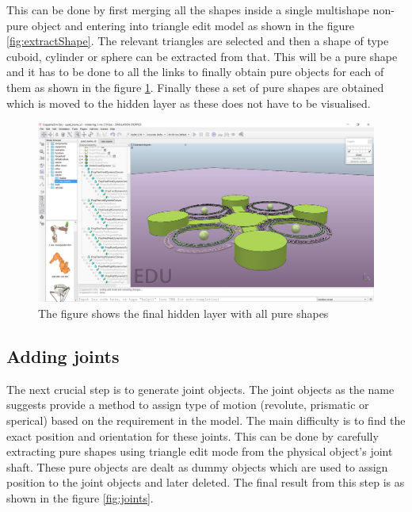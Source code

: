 \documentclass[a4paper, 12pt, oneside]{book}
\begin{document}
This can be done by first merging all the shapes inside a single multishape non-pure object and entering into triangle edit model as shown in the figure \ref{fig:extractShape}. The relevant triangles are selected and then a shape of type cuboid, cylinder or sphere can be extracted from that. This will be a pure shape and it has to be done to all the links to finally obtain pure objects for each of them as shown in the figure \ref{fig:hiddenLayer}. Finally these a set of pure shapes are obtained which is moved to the hidden layer as these does not have to be visualised.

\begin{figure}[H]
    \begin{center}
        \includegraphics[width=.95\linewidth]{figures/hidden_layer.JPG}
        \caption{The figure shows the final hidden layer with all pure shapes}
        \label{fig:hiddenLayer}
    \end{center}
\end{figure}

\subsection{Adding joints}
The next crucial step is to generate joint objects. The joint objects as the name suggests provide a method to assign type of motion (revolute, prismatic or sperical) based on the requirement in the model. The main difficulty is to find the exact position and orientation for these joints. This can be done by carefully extracting pure shapes using triangle edit mode from the physical object's joint shaft. These pure objects are dealt as dummy objects which are used to assign position to the joint objects and later deleted. The final result from this step is as shown in the figure \ref{fig:joints}. 
\end{document}
